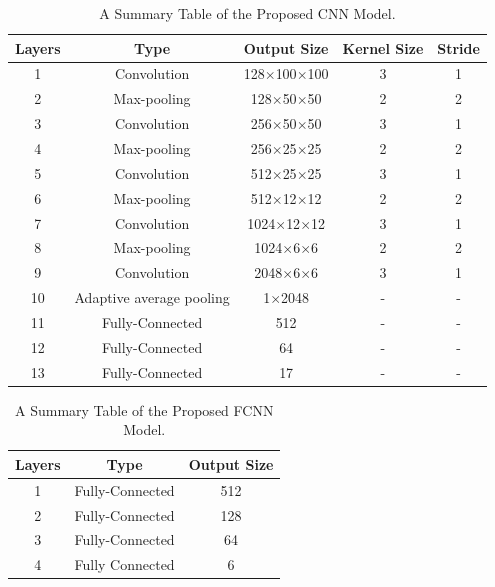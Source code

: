 \documentclass[10pt, journal, letterpaper]{IEEEtran}
\begin{document}
\begin{table}[ht]
	\scriptsize
	\centering
	\caption{A Summary Table of the Proposed CNN Model.}
	\begin{tabular}{ccccc}
		\toprule
		\textbf{Layers} & \textbf{Type} & \textbf{Output Size} & \textbf{Kernel Size} & \textbf{Stride} \\
		\hline
		1 & Convolution & 128$\times$100$\times$100 & 3 & 1 \\
		2 & Max-pooling & 128$\times$50$\times$50 & 2 & 2 \\
		3 & Convolution & 256$\times$50$\times$50 & 3 & 1 \\
		4 & Max-pooling & 256$\times$25$\times$25 & 2 & 2 \\
		5 & Convolution & 512$\times$25$\times$25 & 3 & 1 \\
		6 & Max-pooling & 512$\times$12$\times$12 & 2 & 2 \\
		7 & Convolution & 1024$\times$12$\times$12 & 3 & 1 \\
		8 & Max-pooling & 1024$\times$6$\times$6 & 2 & 2 \\
		9 & Convolution & 2048$\times$6$\times$6 & 3 & 1 \\
		10 & Adaptive average pooling & 1$\times$2048 & - & - \\
		11 & Fully-Connected & 512 & - & - \\
		12 & Fully-Connected & 64 & - & - \\
		13 & Fully-Connected & 17 & - & - \\
		\bottomrule
	\end{tabular}
	\label{table_model_nn}
\end{table}

\begin{table}[ht]
	\scriptsize
	\centering
	\caption{A Summary Table of the Proposed FCNN Model.}
	\begin{tabular}{ccc}
		\toprule
		\textbf{Layers} & \textbf{Type} & \textbf{Output Size} \\
		\hline
		1 & Fully-Connected & 512 \\
		2 & Fully-Connected & 128 \\
		3 & Fully-Connected & 64 \\
		4 & Fully Connected & 6 \\
		\bottomrule
	\end{tabular}
	\label{table_model_fc}
\end{table}

\end{document}
